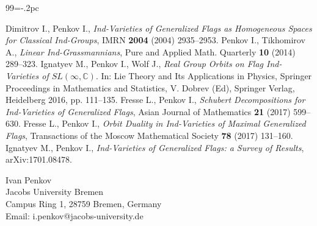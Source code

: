 \documentclass[11pt,twoside]{gsp}
\begin{document}
\begin{thebibliography}{99}\itemsep=-.2pc

 Dimitrov I., Penkov I., {\it Ind-Varieties of Generalized Flags as Homogeneous Spaces for Classical Ind-Groups}, IMRN {\bf 2004} (2004) 2935--2953.
 Penkov I., Tikhomirov A., {\it Linear Ind-Grassmannians}, Pure and Applied Math. Quarterly {\bf 10} (2014) 289--323.
 Ignatyev M., Penkov I., Wolf J., {\it Real Group Orbits on Flag Ind-Varieties of $SL(\infty,\mathbb C)$}. In: Lie Theory and Its Applications in Physics, Springer Proceedings in Mathematics and Statistics, V. Dobrev (Ed), Springer Verlag, Heidelberg  2016, pp. 111--135.	
 Fresse L., Penkov I., {\it Schubert Decompositions for Ind-Varieties of Generalized Flags}, Asian Journal of Mathematics {\bf 21} (2017) 599--630.
 Fresse L., Penkov I., {\it Orbit Duality in Ind-Varieties of Maximal Generalized Flags}, Transactions of the Moscow Mathematical Society {\bf 78} (2017) 131--160.
 Ignatyev M., Penkov I., {\it Ind-Varieties of Generalized Flags: a Survey of Results}, arXiv:1701.08478.

\end{thebibliography}











\bigskip
\bigskip
\bigskip

Ivan Penkov\\
Jacobs University Bremen\\
Campus Ring 1, 28759 Bremen, Germany\\
Email: i.penkov@jacobs-university.de

\label{last}
\end{document}
